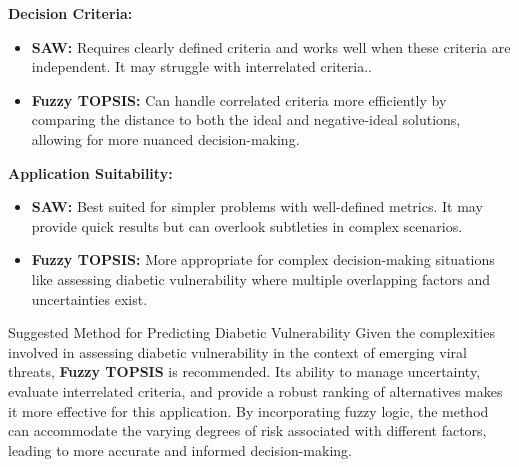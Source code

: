\documentclass[serif, aspectratio=169]{beamer}
\newtheorem{thm co}{Theorem contd...}
\begin{document}
\begin{frame}
\item \textbf{Decision Criteria:}
    \begin{itemize}
        \item \textbf{SAW: } Requires clearly defined criteria and works well when these criteria are independent. It may struggle with interrelated criteria..

        \item \textbf{Fuzzy TOPSIS: } Can handle correlated criteria more efficiently by comparing the distance to both the ideal and negative-ideal solutions, allowing for more nuanced decision-making.  
 
    \end{itemize}

     \item \textbf{Application Suitability:}
    \begin{itemize}
        \item \textbf{SAW: } Best suited for simpler problems with well-defined metrics. It may provide quick results but can overlook subtleties in complex scenarios.

        \item \textbf{Fuzzy TOPSIS: } More appropriate for complex decision-making situations like assessing diabetic vulnerability where multiple overlapping factors and uncertainties exist.
 
    \end{itemize}
    
\end{frame}

\begin{frame}{Suggested Method for Predicting Diabetic Vulnerability}
\hspace{1em}Given the complexities involved in assessing diabetic vulnerability in the context of emerging viral threats, \textbf{Fuzzy TOPSIS} is recommended. Its ability to manage uncertainty, evaluate interrelated criteria, and provide a robust ranking of alternatives makes it more effective for this application. By incorporating fuzzy logic, the method can accommodate the varying degrees of risk associated with different factors, leading to more accurate and informed decision-making.
    
\end{frame}
\end{document}
